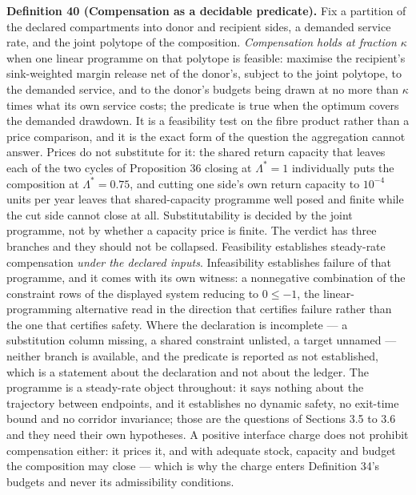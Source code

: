 \documentclass[11pt]{article}
\begin{document}
\textbf{Definition 40 (Compensation as a decidable predicate).} Fix a partition of the declared
compartments into donor and recipient sides, a demanded service rate, and the joint polytope of the
composition. \emph{Compensation holds at fraction \(\kappa\)} when one linear programme on that polytope is
feasible: maximise the recipient's sink-weighted margin release net of the donor's, subject to the joint
polytope, to the demanded service, and to the donor's budgets being drawn at no more than \(\kappa\) times
what its own service costs; the predicate is true when the optimum covers the demanded drawdown. It is a
feasibility test on the fibre product rather than a price comparison, and it is the exact form of the
question the aggregation cannot answer. Prices do not substitute for it: the shared return capacity that
leaves each of the two cycles of Proposition 36 closing at \(\Lambda^{*} = 1\) individually puts the
composition at \(\Lambda^{*} = 0.75\), and cutting one side's own return capacity to \(10^{-4}\) units per
year leaves that shared-capacity programme well posed and finite while the cut side cannot close at all.
Substitutability is decided by the joint programme, not by whether a capacity price is finite.
The verdict has three branches and they should not be collapsed. Feasibility establishes steady-rate
compensation \emph{under the declared inputs}. Infeasibility establishes failure of that programme, and it comes
with its own witness: a nonnegative combination of the constraint rows of the displayed system reducing to
\(0 \le -1\), the linear-programming alternative read in the direction that certifies failure rather than the
one that certifies safety. Where the declaration is incomplete --- a substitution column missing, a shared
constraint unlisted, a target unnamed --- neither branch is available, and the predicate is reported as not
established, which is a statement about the declaration and not about the ledger. The programme is a
steady-rate object throughout: it says nothing about the trajectory between endpoints, and it establishes no
dynamic safety, no exit-time bound and no corridor invariance; those are the questions of Sections 3.5 to 3.6
and they need their own hypotheses. A positive interface charge does not prohibit compensation either: it
prices it, and with adequate stock, capacity and budget the composition may close --- which is why the charge
enters Definition 34's budgets and never its admissibility conditions.
\end{document}
